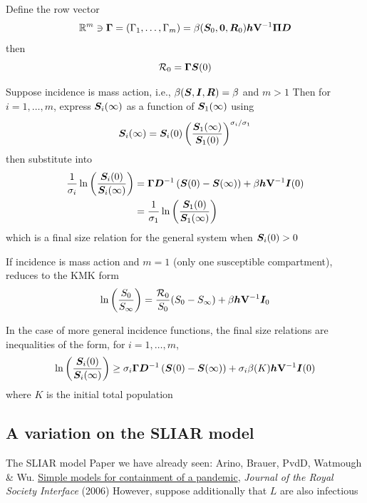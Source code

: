 \documentclass[aspectratio=169]{beamer}\usepackage[]{graphicx}\usepackage[]{xcolor}
\begin{document}
\begin{frame}
Define the row vector 
\[
\IR^m\ni\bGamma
=(\Gamma_1,\ldots,\Gamma_m)=\beta(\bS_0,\b0,\bR_0)\bh\mathbf{V}^{-1}\bPi\bD
\]
then 
\[
\mathcal{R}_0=\bm{\Gamma}\bm{S}(0)
\]
\end{frame}  

\begin{frame}
Suppose incidence is mass action, i.e., $\beta(\bm{S},\bm{I},\bm{R})=\beta$ and $m>1$
\vfill
Then for $i=1,\ldots,m$, express $\bm{S}_i(\infty)$ as a function of $\bm{S}_1(\infty)$ using
$$
\bm{S}_i(\infty)  = 
\bm{S}_i(0) \left(
\frac{\bm{S}_1(\infty)}{\bm{S}_1(0)}
\right)^{\sigma_i/\sigma_1}
$$
then substitute into 
\begin{align*}
\frac{1}{\sigma_i}
\ln\left(\frac{\bm{S}_i(0)}{\bm{S}_i(\infty)}\right)
&=
\bm{\Gamma}\bm{D}^{-1}\left(\bm{S}(0)-\bm{S}(\infty)\right)
+\beta\bm{h}\mathbf{V}^{-1}\bm{I}(0) \\
&= 
\frac{1}{\sigma_1}
\ln\left(\frac{\bm{S}_1(0)}{\bm{S}_1(\infty)}\right)
\end{align*}
which is a final size relation for the general system when $\bm{S}_i(0)>0$
\end{frame}  


\begin{frame}
If incidence is mass action and $m=1$ (only one susceptible compartment), reduces to the KMK form
\begin{equation}
\label{eq:final_size_m1}
\ln\left(
\frac{S_0}{S_\infty}
\right)
=\frac{\mathcal{R}_0}{S_0}
(S_0-S_\infty)+\beta\bm{h}\mathbf{V}^{-1}\bm{I}_0
\end{equation}
\end{frame}  


\begin{frame}
In the case of more general incidence functions, the final size relations are inequalities of the form, for $i=1,\ldots,m$,
$$
\ln\left(\frac{\bm{S}_i(0)}{\bm{S}_i(\infty)}\right)
\geq
\sigma_i\bm{\Gamma}\bm{D}^{-1}\left(\bm{S}(0)-\bm{S}(\infty)\right)
+\sigma_i\beta(K)\bm{h}\mathbf{V}^{-1}\bm{I}(0)
$$
where $K$ is the initial total population
\end{frame}  

\subsection{A variation on the SLIAR model}

\begin{frame}{The SLIAR model}
\bbullet Paper we have already seen: Arino, Brauer, PvdD, Watmough \& Wu. \href{http://dx.doi.org/10.1098/rsif.2006.0112}{Simple models for containment of a pandemic}, \emph{Journal of the Royal Society Interface} (2006)
\vfill
\bbullet However, suppose additionally that $L$ are also infectious
\end{frame}  
\end{document}

